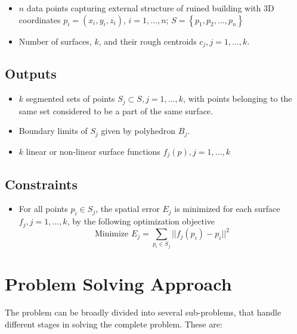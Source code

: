 \documentclass[12pt,a4paper]{article}
\begin{document}
    \begin{itemize}
        \itemsep0em 
        \item $n$ data points capturing external structure of ruined building with 3D coordinates $p_i = (x_i, y_i, z_i)$, $i = 1,\dots,n$; $S=\left\{p_{1},p_{2},\dots,p_{n}\right\}$
        \item Number of surfaces, $k$, and their rough centroids $c_j, j=1, \dots, k$.
    \end{itemize}
    
    \subsection{Outputs}
    
    \begin{itemize}
        \itemsep0em 

        \item $k$ segmented sets of points $S_j \subset S, j=1,\dots,k$, with points belonging to the same set considered to be a part of the same surface.
        \item Boundary limits of $S_j$ given by polyhedron $B_j$.
        \item $k$ linear or non-linear surface functions $f_j(p), j=1,\dots,k$
        
        
    \end{itemize}
    
    \subsection{Constraints}
    
    \begin{itemize}
        \item For all points $p_i \in S_j$, the spatial error $E_j$ is minimized for each surface $f_j, j=1,\dots,k$, by the following optimization objective
        \begin{equation}
        \textrm{Minimize } E_j = \sum_{p_i \in S_j} {||f_j(p_i) - p_i ||^2} %
        \end{equation}
    \end{itemize}
    
    \section{Problem Solving Approach}
    
    The problem can be broadly divided into several sub-problems, that handle different stages in solving the complete problem. These are:
    
\end{document}
